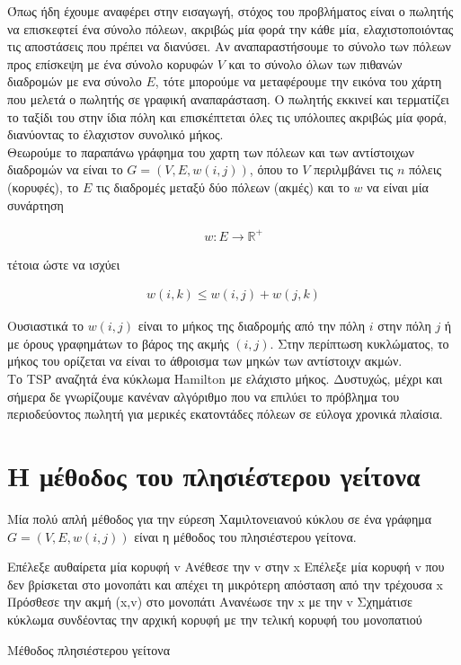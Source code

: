 \documentclass[oneside,12pt]{book}
\newcommand{\R}{\mathbb{R}}
\theoremstyle{definition}
\begin{document}
Όπως ήδη έχουμε αναφέρει στην εισαγωγή, στόχος του προβλήματος είναι ο πωλητής να επισκεφτεί ένα σύνολο πόλεων, ακριβώς μία φορά την κάθε μία, ελαχιστοποιόντας τις αποστάσεις που πρέπει να διανύσει. Αν αναπαραστήσουμε το σύνολο των πόλεων προς επίσκεψη με ένα σύνολο κορυφών \(V\) και το σύνολο όλων των πιθανών διαδρομών με ενα σύνολο \(E\), τότε μπορούμε να μεταφέρουμε την εικόνα του χάρτη που μελετά ο πωλητής σε γραφική αναπαράσταση. Ο πωλητής εκκινεί και τερματίζει το ταξίδι του στην ίδια πόλη και επισκέπτεται όλες τις υπόλοιπες ακριβώς μία φορά, διανύοντας το έλαχιστον συνολικό μήκος. \\

Θεωρούμε το παραπάνω γράφημα του χαρτη των πόλεων και των αντίστοιχων διαδρομών να είναι το \(G = (V,E,w(i,j))\), όπου το \(V\) περιλμβάνει τις \(n\) πόλεις  (κορυφές), το \(E\) τις διαδρομές μεταξύ δύο πόλεων (ακμές) και το \(w\) να είναι μία συνάρτηση 

\begin{align}
	w:E \rightarrow \R^{+}
\end{align} 
 
τέτοια ώστε να ισχύει 

\begin{align}
	w(i,k) \leq w(i,j) + w(j,k)
\end{align} 

Ουσιαστικά το \(w(i,j)\) είναι το μήκος της διαδρομής από την πόλη \(i\) στην πόλη \(j\) ή με όρους γραφημάτων το βάρος της ακμής \((i,j)\). Στην περίπτωση κυκλώματος, το μήκος του ορίζεται να είναι το άθροισμα των μηκών των αντίστοιχν ακμών. \\

Το TSP αναζητά ένα κύκλωμα Hamilton με ελάχιστο μήκος. Δυστυχώς, μέχρι και σήμερα δε γνωρίζουμε κανέναν αλγόριθμο που να επιλύει το πρόβλημα του περιοδεύοντος πωλητή για μερικές εκατοντάδες πόλεων σε εύλογα χρονικά πλαίσια. \\

\section{Η μέθοδος του πλησιέστερου γείτονα}

Μία πολύ απλή μέθοδος για την εύρεση Χαμιλτονειανού κύκλου σε ένα γράφημα \(G = (V,E,w(i,j))\) είναι η μέθοδος του πλησιέστερου γείτονα. 

\begin{algorithm}[H]
	\SetAlgoLined
	
	Επέλεξε αυθαίρετα μία κορυφή v \;
	Ανέθεσε την v στην x \;
	{Επέλεξε μία κορυφή v που δεν βρίσκεται στο μονοπάτι και απέχει τη μικρότερη απόσταση από την τρέχουσα x \;
	Πρόσθεσε την ακμή (x,v) στο μονοπάτι \;
	Ανανέωσε την x με την v \;}
	Σχημάτισε κύκλωμα συνδέοντας την αρχική κορυφή με την τελική κορυφή του μονοπατιού \;
	
	\caption{Μέθοδος πλησιέστερου γείτονα}
\end{algorithm}
\end{document}

